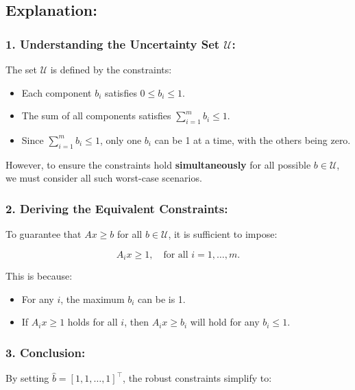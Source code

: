 \documentclass{article}
\begin{document}
\subsection{Explanation:}

\subsubsection{1. Understanding the Uncertainty Set $\mathcal{U}$:}

The set $\mathcal{U}$ is defined by the constraints:

\begin{itemize}
\item Each component $b_i$ satisfies $0 \leq b_i \leq 1$.
\item The sum of all components satisfies $\sum_{i=1}^m b_i \leq 1$.
\item Since $\sum_{i=1}^m b_i \leq 1$, only one $b_i$ can be 1 at a time, with the others being zero.
\end{itemize}

However, to ensure the constraints hold \textbf{simultaneously} for all possible $b \in \mathcal{U}$, we must consider all such worst-case scenarios.

\subsubsection{2. Deriving the Equivalent Constraints:}

To guarantee that $Ax \geq b$ for all $b \in \mathcal{U}$, it is sufficient to impose:

\begin{equation*}
A_i x \geq 1, \quad \text{for all } i = 1, \dots, m.
\end{equation*}

This is because:

\begin{itemize}
\item For any $i$, the maximum $b_i$ can be is 1.
\item If $A_i x \geq 1$ holds for all $i$, then $A_i x \geq b_i$ will hold for any $b_i \leq 1$.
\end{itemize}

\subsubsection{3. Conclusion:}

By setting $\hat{b} = [1, 1, \dots, 1]^\top$, the robust constraints simplify to:
\end{document}
